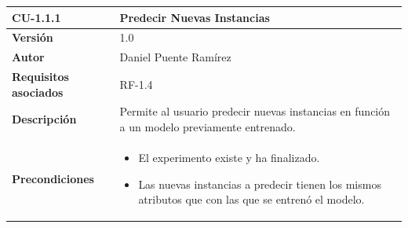 \begin{longtable}[H]{@{}ll@{}}
\toprule
\begin{minipage}[b]{0.23\columnwidth}\raggedright\strut
\textbf{CU-1.1.1}\strut
\end{minipage} & \begin{minipage}[b]{0.71\columnwidth}\raggedright\strut
\textbf{Predecir Nuevas Instancias}\strut
\end{minipage}\tabularnewline
\midrule
\endhead
\begin{minipage}[t]{0.23\columnwidth}\raggedright\strut
\textbf{Versión}\strut
\end{minipage} & \begin{minipage}[t]{0.71\columnwidth}\raggedright\strut
1.0\strut
\end{minipage}\tabularnewline
\begin{minipage}[t]{0.23\columnwidth}\raggedright\strut
\textbf{Autor}\strut
\end{minipage} & \begin{minipage}[t]{0.71\columnwidth}\raggedright\strut
Daniel Puente Ramírez\strut
\end{minipage}\tabularnewline
\begin{minipage}[t]{0.23\columnwidth}\raggedright\strut
\textbf{Requisitos asociados}\strut
\end{minipage} & \begin{minipage}[t]{0.71\columnwidth}\raggedright\strut
RF-1.4\strut
\end{minipage}\tabularnewline
\begin{minipage}[t]{0.23\columnwidth}\raggedright\strut
\textbf{Descripción}\strut
\end{minipage} & \begin{minipage}[t]{0.71\columnwidth}\raggedright\strut
Permite al usuario predecir nuevas instancias en función a un modelo previamente entrenado.\strut
\end{minipage}\tabularnewline
\begin{minipage}[t]{0.23\columnwidth}\raggedright\strut
\textbf{Precondiciones}\strut
\end{minipage} & \begin{minipage}[t]{0.71\columnwidth}\raggedright\strut
\begin{itemize}
\tightlist
\item El experimento existe y ha finalizado.
\item Las nuevas instancias a predecir tienen los mismos atributos que con las que se entrenó el modelo.

\end{itemize}
\end{minipage}
\end{longtable}
